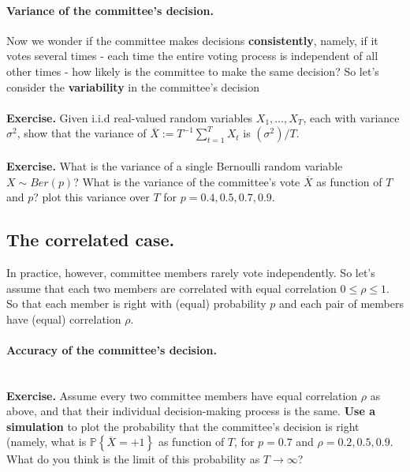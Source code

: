 \documentclass[11pt]{article}
\newcommand{\Prob}{\ensuremath{\mathbb{P}}}
\begin{document}
\paragraph{Variance of the committee's decision.} 
Now we wonder if the committee makes decisions {\bf consistently}, namely, if it
votes several times - each time the entire voting process is independent of all
other times - how likely is the committee to make the same decision?
So let's consider the {\bf variability} in the committee's decision
\\~\\
{\bf Exercise.} Given i.i.d real-valued 
random variables $X_1,\ldots,X_T$, each with variance $\sigma^2$, show that the
variance of $\overline{X}:=T^{-1}\sum_{t=1}^T X_t$ is $(\sigma^2)/T$.
\\~\\
{\bf Exercise.} What is the variance of a single Bernoulli random variable
$X\sim Ber(p)$? What is the variance of the committee's vote $\overline{X}$  as
function of $T$ and $p$? plot this variance over $T$ for $p=0.4,0.5,0.7,0.9$. 



\subsection{The correlated case.}


In practice, however, committee members rarely vote independently. So let's
assume that each two members are correlated with equal correlation $0\leq  \rho
\leq 1 $. So that each member is right with (equal) probability $p$ and each pair of
members have (equal) correlation $\rho$. 

\paragraph{Accuracy of the committee's decision.} 
~\\
{\bf Exercise.} Assume every two committee members have equal correlation $\rho$
as above, and that their individual decision-making process is the same.
{\bf Use a simulation} to plot 
 the probability that the committee's decision is right (namely, what is
  $\Prob\left\{ \overline{X}=+1 \right\}$ as function of  $T$, for $p=0.7$ 
  and $\rho=0.2, 0.5, 0.9$.
  What do you think is the limit of this probability as $T\to\infty$? 
\end{document}
